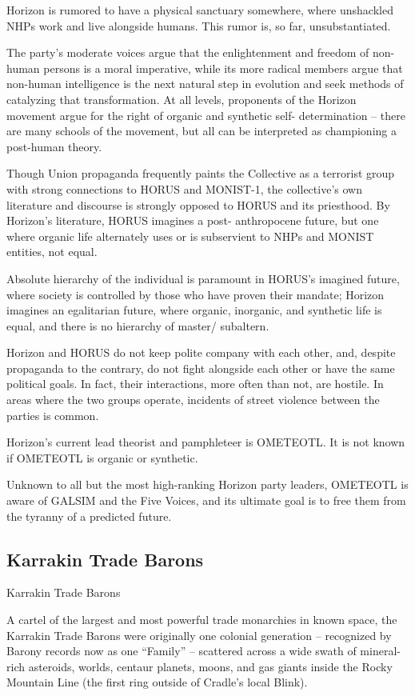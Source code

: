 Horizon is rumored to have a physical sanctuary somewhere, where unshackled NHPs work and
live alongside humans. This rumor is, so far, unsubstantiated.


The party’s moderate voices argue that the enlightenment and freedom of non-human persons is
a moral imperative, while its more radical members argue that non-human intelligence is the next
natural step in evolution and seek methods of catalyzing that transformation. At all levels,
proponents of the Horizon movement argue for the right of organic and synthetic self-
determination -- there are many schools of the movement, but all can be interpreted as
championing a post-human theory.


Though Union propaganda frequently paints the Collective as a terrorist group with strong
connections to HORUS and MONIST-1, the collective’s own literature and discourse is strongly
opposed to HORUS and its priesthood. By Horizon’s literature, HORUS imagines a post-
anthropocene future, but one where organic life alternately uses or is subservient to NHPs and
MONIST entities, not equal.


Absolute hierarchy of the individual is paramount in HORUS’s imagined future, where society is
controlled by those who have proven their mandate; Horizon imagines an egalitarian future,
where organic, inorganic, and synthetic life is equal, and there is no hierarchy of master/
subaltern.


Horizon and HORUS do not keep polite company with each other, and, despite propaganda to
the contrary, do not fight alongside each other or have the same political goals. In fact, their
interactions, more often than not, are hostile. In areas where the two groups operate, incidents of
street violence between the parties is common.


Horizon’s current lead theorist and pamphleteer is OMETEOTL. It is not known if OMETEOTL is
organic or synthetic.


Unknown to all but the most high-ranking Horizon party leaders, OMETEOTL is aware of GALSIM
and the Five Voices, and its ultimate goal is to free them from the tyranny of a predicted future.



\subsection{Karrakin Trade Barons}

Karrakin Trade Barons

A cartel of the largest and most powerful trade monarchies in known space, the Karrakin Trade
Barons were originally one colonial generation -- recognized by Barony records now as one
“Family” -- scattered across a wide swath of mineral-rich asteroids, worlds, centaur planets,
moons, and gas giants inside the Rocky Mountain Line (the first ring outside of Cradle’s local
Blink).


